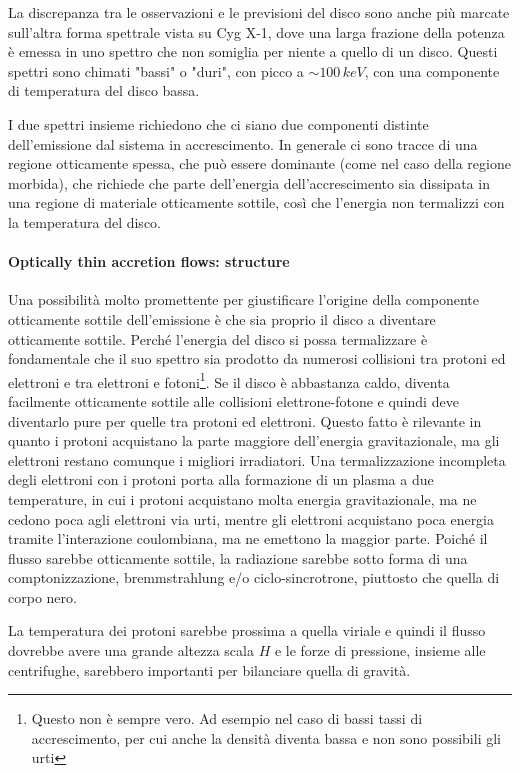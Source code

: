 \documentclass[a4paperbi]{article}
\begin{document}
La discrepanza tra le osservazioni e le previsioni del disco sono anche più marcate sull'altra forma spettrale vista su Cyg X-1, dove una larga frazione della potenza è emessa in uno spettro che non somiglia per niente a quello di un disco. Questi spettri sono chimati "bassi" o "duri", con picco a $\sim100\,keV$, con una componente di temperatura del disco bassa.

I due spettri insieme richiedono che ci siano due componenti distinte dell'emissione dal sistema in accrescimento. In generale ci sono tracce di una regione otticamente spessa, che può essere dominante (come nel caso della regione morbida), che richiede che parte dell'energia dell'accrescimento sia dissipata in una regione di materiale otticamente sottile, così che l'energia non termalizzi con la temperatura del disco.

\paragraph{Optically thin accretion flows: structure}

	Una possibilità molto promettente per giustificare l'origine della componente otticamente sottile dell'emissione è che sia proprio il disco a diventare otticamente sottile. Perché l'energia del disco si possa termalizzare è fondamentale che il suo spettro sia prodotto da numerosi collisioni tra protoni ed elettroni e tra elettroni e fotoni\footnote{Questo non è sempre vero. Ad esempio nel caso di bassi tassi di accrescimento, per cui anche la densità diventa bassa e non sono possibili gli urti}. Se il disco è abbastanza caldo, diventa facilmente otticamente sottile alle collisioni elettrone-fotone e quindi deve diventarlo pure per quelle tra protoni ed elettroni. Questo fatto è rilevante in quanto i protoni acquistano la parte maggiore dell'energia gravitazionale, ma gli elettroni restano comunque i migliori irradiatori. Una termalizzazione incompleta degli elettroni con i protoni porta alla formazione di un plasma a due temperature, in cui i protoni acquistano molta energia gravitazionale, ma ne cedono poca agli elettroni via urti, mentre gli elettroni acquistano poca energia tramite l'interazione coulombiana, ma ne emettono la maggior parte.
	Poiché il flusso sarebbe otticamente sottile, la radiazione sarebbe sotto forma di una comptonizzazione, bremmstrahlung e/o ciclo-sincrotrone, piuttosto che quella di corpo nero.
	
	La temperatura dei protoni sarebbe prossima a quella viriale e quindi il flusso dovrebbe avere una grande altezza scala $H$ e le forze di pressione, insieme alle centrifughe, sarebbero importanti per bilanciare quella di gravità.
	
\end{document}
